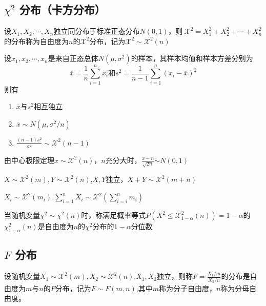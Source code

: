     \subsection{\texorpdfstring{$ \chi^2$}{χ2} 分布（卡方分布）}
    \begin{definition}
        设$X_1,X_2,\cdots,X_n$独立同分布于标准正态分布$N(0,1)$，则$\ \mathcal{X}^2=X_1^2+X_2^2+\cdots+X_n^2$的分布称为自由度为$n$的$\mathcal{X}^2$分布，记为$\mathcal{X}^2 \sim  \mathcal{X}^2(n)$
    \end{definition}
    \begin{theorem}
        设$x_1,x_2,\cdots,x_n$是来自正态总体$N(\mu,\sigma^2)$的样本，其样本均值和样本方差分别为
        $$
            \overline{x}=\frac{1}{n}\sum_{i=1}^{n}x_i \text{和} s^2=\frac{1}{n-1}\sum_{i=1}^{n}(x_i-\overline{x})^2
        $$
        则有
        \begin{enumerate}[(1)]
            \item $\overline{x}$与$s^2$相互独立
            \item $\overline{x}\sim N(\mu,\sigma^2 /n)$
            \item $\frac{(n-1)s^2}{\sigma^2}\sim \mathcal{X}^2(n-1)$
        \end{enumerate}
    \end{theorem}
    由中心极限定理$x\sim \mathcal{X}^2(n)$，$n$充分大时，$\frac{x-n}{\sqrt{2n}}\dot{\sim} N(0,1)$
    \begin{theorem}
        $X \sim \mathcal{X}^2(m),Y \sim \mathcal{X}^2(n)$,$X,Y$独立，$X+Y\sim\mathcal{X}^2(m+n)$
    \end{theorem}
    \begin{remark}
        $X_i \sim \mathcal{X}^2(m_i)$,$\sum_{i=1}^{n}X_i \sim \mathcal{X}^2(\sum_{i=i}^{n}m_i)$
    \end{remark}
    当随机变量$\chi^{2} \sim \chi^{2}(n)$时，称满足概率等式$P\left(X^{2}\leq \mathcal{X}_{1-\alpha}^{2}(n)\right)=1-\alpha$的$\chi_{1-\alpha}^{2}(n)$是自由度为$n$的$\chi^2$分布的$1-\alpha$分位数
    \subsection{\texorpdfstring{$F$}{F} 分布}
    \begin{definition}
        设随机变量$X_1 \sim \mathcal{X}^2(m),X_2 \sim \mathcal{X}^2(n)$,$X_1,X_2$独立，则称$F=\frac{X_1/m}{X_2/n}$的分布是自由度为$m$与$n$的$F$分布，记为$F \sim F(m,n)$,其中$m$称为分子自由度，$n$称为分母自由度。
    \end{definition}

